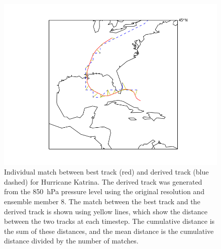 \documentclass[pdftex,12pt,a4paper]{report}
\begin{document}
\begin{figure}[hbp]
    \centering
    \includegraphics[width=\linewidth]{figures/katrina_individual_match_em7}
    \caption{Individual match between best track (red) and derived track (blue dashed) for Hurricane
        Katrina. The derived track was generated from the \SI{850}{hPa} pressure level using the
        original resolution and ensemble member 8. The match between the best track and the derived
        track is shown using yellow lines, which show the distance between the two tracks at each
        timestep. The cumulative distance is the sum of these distances, and the mean distance is
        the cumulative distance divided by the number of matches.
    }
    \label{fig:katrina_individual_match_em7}
\end{figure}
\end{document}
